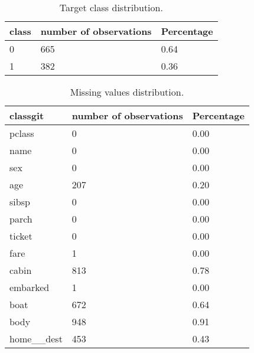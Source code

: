 \documentclass{article}%
\begin{document}
%


\begin{table}[H]%
\begin{center}%
\begin{tabular}{l l l}%
\hline%
\textbf{class}&\textbf{number of observations}&\textbf{Percentage}\\%
\hline%
0&665&0.64\\%
1&382&0.36\\%
\hline%
\end{tabular}%
\end{center}%
\caption{Target class distribution.}%
\end{table}

%


\begin{table}[H]%
\begin{center}%
\begin{tabular}{l l l}%
\hline%
\textbf{classgit}&\textbf{number of observations}&\textbf{Percentage}\\%
\hline%
pclass&0&0.00\\%
name&0&0.00\\%
sex&0&0.00\\%
age&207&0.20\\%
sibsp&0&0.00\\%
parch&0&0.00\\%
ticket&0&0.00\\%
fare&1&0.00\\%
cabin&813&0.78\\%
embarked&1&0.00\\%
boat&672&0.64\\%
body&948&0.91\\%
home\_\_dest&453&0.43\\%
\hline%
\end{tabular}%
\end{center}%
\caption{Missing values distribution.}%
\end{table}

%
\end{document}
